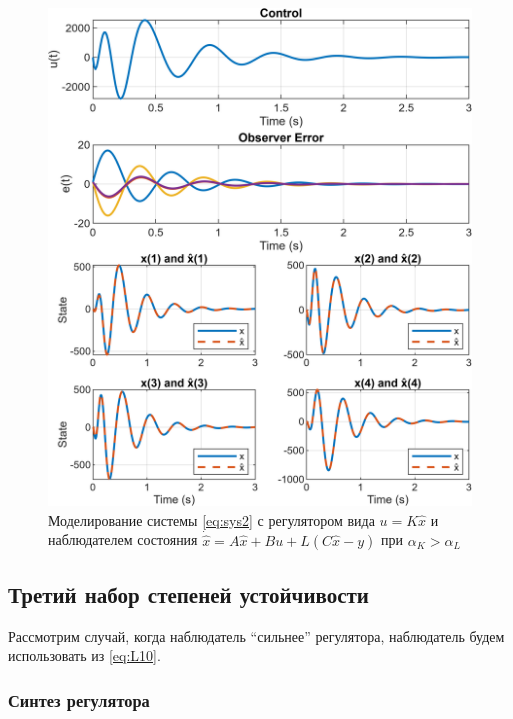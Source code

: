 \begin{figure}[H]
    \centering
    \includegraphics[width=\linewidth]{figs/task2_2.png}
    \caption{Моделирование системы \eqref{eq:sys2} с регулятором вида $u=K\hat x$
    и наблюдателем состояния $\dot{\hat x}=A\hat x+Bu+L(C\hat x-y)$ при $\alpha_K>\alpha_L$}
    \label{fig:22}
\end{figure}


\newpage
\subsection{Третий набор степеней устойчивости}


Рассмотрим случай, когда наблюдатель ``сильнее'' регулятора, наблюдатель будем
использовать из \autoref{eq:L10}.


\subsubsection{Синтез регулятора}

